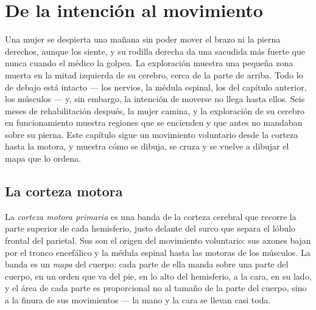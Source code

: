 \chapter{De la intención al movimiento}\label{ch:g12:brain-and-movement}

Una mujer se despierta una mañana sin poder mover el brazo ni la pierna
derechos, aunque los siente, y su rodilla derecha da una sacudida más
fuerte que nunca cuando el médico la golpea. La exploración muestra una
pequeña zona muerta en la mitad izquierda de su cerebro, cerca de la
parte de arriba. Todo lo de debajo está intacto --- los nervios, la
médula espinal, los  del capítulo anterior, los músculos
--- y, sin embargo, la intención de moverse no llega hasta ellos. Seis
meses de rehabilitación después, la mujer camina, y la exploración de
su cerebro en funcionamiento muestra regiones que se encienden y que
antes no mandaban sobre su pierna. Este capítulo sigue un movimiento
voluntario desde la corteza hasta la  motora, y muestra cómo se
dibuja, se cruza y se vuelve a dibujar el mapa que lo ordena.

\section{La corteza motora}

\begin{definition}\label{def:g12:brain-and-movement:cortex}
La \emph{corteza motora primaria} es una banda de
la corteza cerebral que recorre la parte superior de cada hemisferio,
justo delante del surco que separa el lóbulo frontal del parietal. Sus
 son el origen del movimiento voluntario: sus axones bajan por
el tronco encefálico y la médula espinal hasta las  motoras de
los músculos. La banda es un \emph{mapa} del cuerpo: cada parte de ella
manda sobre una parte del cuerpo, en un orden que va del pie, en lo
alto del hemisferio, a la cara, en su lado, y el área de cada parte es
proporcional no al tamaño de la parte del cuerpo, sino a la finura de
sus movimientos --- la mano y la cara se llevan casi toda.
\end{definition}

